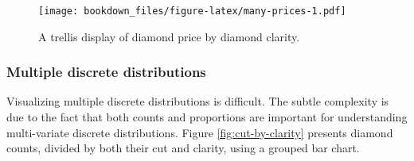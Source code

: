\documentclass[12pt,]{isuthesis}
\newenvironment{Shaded}{\begin{snugshade}}{\end{snugshade}}
\newcommand{\KeywordTok}[1]{\textcolor[rgb]{0.13,0.29,0.53}{\textbf{{#1}}}}
\newcommand{\DataTypeTok}[1]{\textcolor[rgb]{0.13,0.29,0.53}{{#1}}}
\newcommand{\DecValTok}[1]{\textcolor[rgb]{0.00,0.00,0.81}{{#1}}}
\newcommand{\FloatTok}[1]{\textcolor[rgb]{0.00,0.00,0.81}{{#1}}}
\newcommand{\StringTok}[1]{\textcolor[rgb]{0.31,0.60,0.02}{{#1}}}
\newcommand{\OtherTok}[1]{\textcolor[rgb]{0.56,0.35,0.01}{{#1}}}
\newcommand{\NormalTok}[1]{{#1}}
\begin{document}
\begin{Shaded}
\end{Shaded}

\begin{figure}[htbp]
\centering
\texttt{[image: bookdown\_files/figure-latex/many-prices-1.pdf]}
\caption{\label{fig:many-prices}A trellis display of diamond price by
diamond clarity.}
\end{figure}

\hypertarget{multiple-discrete-distributions}{\subsubsection{Multiple
discrete distributions}\label{multiple-discrete-distributions}}

Visualizing multiple discrete distributions is difficult. The subtle
complexity is due to the fact that both counts and proportions are
important for understanding multi-variate discrete distributions. Figure
\ref{fig:cut-by-clarity} presents diamond counts, divided by both their
cut and clarity, using a grouped bar chart.

\begin{Shaded}
\end{Shaded}
\end{document}
